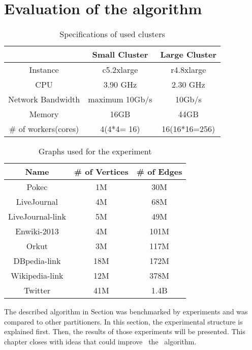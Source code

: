 \documentclass[acmsmall,nonacm,screen,review]{acmart}
\begin{document}
\section{Evaluation of the algorithm}
\begin{table}[bt!]
    \centering
    \begin{tabular}{ccc}
    \hline
     & Small Cluster & Large Cluster \\
    \hline
     Instance & c5.2xlarge & r4.8xlarge\\
     CPU & 3.90 GHz & 2.30 GHz\\
     Network Bandwidth & maximum 10Gb/s & 10Gb/s\\
    Memory  & 16GB & 44GB\\
     \# of workers(cores) & 4(4*4= 16) & 16(16*16=256)\\
     \hline
    \end{tabular}
    \caption{Specifications of used clusters}
    \label{clusters}
\end{table}
\begin{table}[bt!]
    \centering
    \begin{tabular}{ccc}
    \hline
    Name & \# of Vertices & \# of Edges \\
    \hline
     Pokec & 1M & 30M\\
     LiveJournal & 4M & 68M\\
     LiveJournal-link & 5M & 49M \\
     Enwiki-2013 & 4M & 101M \\
     Orkut & 3M & 117M\\
     DBpedia-link & 18M & 172M \\
     Wikipedia-link & 12M & 378M\\
     Twitter & 41M & 1.4B\\
     \hline
    \end{tabular}
    \caption{Graphs used for the experiment}
    \label{graphs}
\end{table}
The described algorithm in Section  was benchmarked by experiments and was compared to other partitioners. In this section, the experimental structure is explained first. Then, the results of those experiments will be presented. This chapter closes with ideas that could improve ~the ~algorithm.
\end{document}
